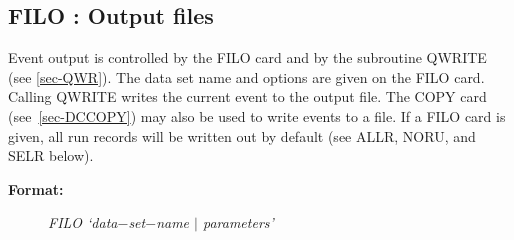 \subsection{\label{sec-DCFILO}FILO : Output files}
\par
\par Event output is controlled by the FILO card and by the subroutine
QWRITE (see
\ref{sec-QWR}). The data set name and options are given on the FILO
card. Calling
QWRITE writes the current event to the output file. The COPY card
(see~\ref{sec-DCCOPY}) may also be used to write events to a file.
If a FILO card is given,
all run records will be written out by default (see ALLR, NORU, and SELR
below).
\begin{description}\item[\bf{Format:
}]{\it FILO `data$-$set$-$name $\mid$ parameters'}\end{description}
